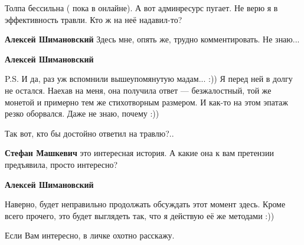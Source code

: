 \begin{itemize}
\begin{itemize}
Толпа бессильна ( пока в онлайне). А вот админресурс пугает. Не верю я в
эффективность травли. Кто ж на неё надавил-то?


 
\textbf{Алексей Шимановский} Здесь мне, опять же, трудно комментировать. Не знаю...

 
\textbf{Алексей Шимановский} 

P.S. И да, раз уж вспомнили вышеупомянутую мадам... :)) Я перед ней в долгу не
остался. Наехав на меня, она получила ответ — безжалостный, той же монетой и
примерно тем же стихотворным размером. И как-то на этом эпатаж резко оборвался.
Даже не знаю, почему :))

Так вот, кто бы достойно ответил на травлю?..


 
\textbf{Стефан Машкевич} это интересная история. А какие она к вам претензии предъявила, просто интересно?

 
\textbf{Алексей Шимановский} 

Наверно, будет неправильно продолжать обсуждать этот момент здесь. Кроме всего
прочего, это будет выглядеть так, что я действую её же методами :))

Если Вам интересно, в личке охотно расскажу.


 

\end{itemize}
\end{itemize}
